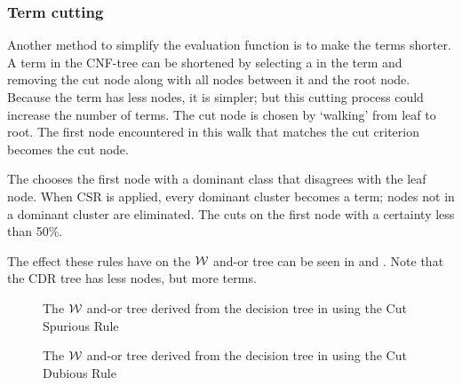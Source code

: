 \subsubsection{Term cutting}
Another method to simplify the evaluation function is to make the terms shorter.  A term in the CNF-tree can be shortened by selecting a  in the term and removing the cut node along with all nodes between it and the root node.  Because the term has less nodes, it is simpler; but this cutting process could increase the number of terms. The cut node is chosen by `walking' from leaf to root.  The first node encountered in this walk that matches the cut criterion becomes the cut node. 

The  chooses the first node with a dominant class that disagrees with the leaf node. When CSR is applied, every dominant cluster becomes a term; nodes not in a dominant cluster are eliminated. The  cuts on the first node with a certainty less than 50\%.  

The effect these rules have on the ${\mathcal W}$ and-or tree can be seen in  and .  Note that the CDR tree has less nodes, but more terms.
\begin{figure} [ht]
\center
\tiny
{}
{
										{
										}
			{
				{
					{
						{ 
							{  }
						}
					}
				}
			}
}
\caption{The ${\mathcal W}$ and-or tree derived from the decision tree in  using the Cut Spurious Rule}
\label{fig:csr}
\end{figure}

\begin{figure} [!htb]
\center
\tiny
{}
{
								{
									{
										{
										}
									}
								}

	{
	}
}
\caption{The ${\mathcal W}$ and-or tree derived from the decision tree in  using the Cut Dubious Rule}
\label{fig:cdr}
\end{figure}

